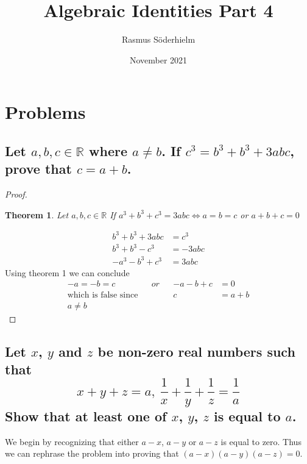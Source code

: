 \documentclass{article}
\title{Algebraic Identities Part 4}
\author{Rasmus Söderhielm}
\date{November 2021}
\newtheorem{theorem}{Theorem}
\begin{document}
\maketitle

\section{Problems}



\subsection{
	\normalfont
	Let $a, b, c \in \mathbb{R} $ where $a \neq b$. If $c^3 = b^3 + b^3 + 3abc$, prove that $c=a+b$.
}

\begin{proof}
	\begin{theorem}
		Let $ a, b, c \in \mathbb{R} $ If $ a^3 + b^3 + c^3 = 3abc \Leftrightarrow a = b = c $ or $ a + b + c = 0 $
	\end{theorem}

	\begin{align*}
		b^3 + b^3 + 3abc & = c^3   \\
		b^3 + b^3 - c^3  & = -3abc \\
		-a^3 - b^3 + c^3 & = 3abc
	\end{align*}
	Using theorem 1 we can conclude
	\begin{align*}
		-a = -b = c                 &  & or &  & -a - b + c & = 0     \\
		\text{which is false since} &  &    &  & c          & = a + b \\
		a \neq b
	\end{align*}
\end{proof}

\subsection{
	\normalfont
	Let $x$, $y$ and $z$ be non-zero real numbers such that
	\[x + y + z = a,\ \frac{1}{x} + \frac{1}{y} + \frac{1}{z} = \frac{1}{a}\]
	Show that at least one of $x$, $y$, $z$ is equal to $a$.	
}
\linespread{1.5}\selectfont
We begin by recognizing that either $a - x$, $a - y$ or $a - z$ is equal to zero. Thus we can rephrase the problem into proving that $ (a - x)(a - y)(a - z) = 0 $.
\end{document}
